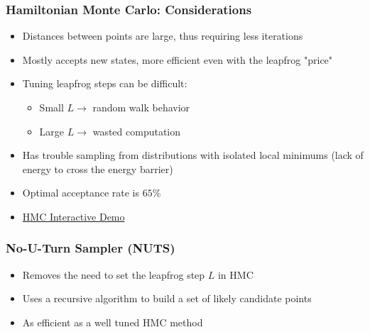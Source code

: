 \documentclass{beamer}
\begin{document}
\begin{frame}
  \frametitle{Hamiltonian Monte Carlo: Considerations}
  \begin{itemize}
    \item Distances between points are large, thus requiring less iterations
    \item Mostly accepts new states, more efficient even with the leapfrog "price"
    \item Tuning leapfrog steps can be difficult:
    \begin{itemize}
      \item Small $L \rightarrow$ random walk behavior
      \item Large $L \rightarrow$ wasted computation
    \end{itemize}
    \item Has trouble sampling from distributions with isolated local minimums (lack of energy to cross the energy barrier)
    \item Optimal acceptance rate is $65\%$
    \item \href{https://chi-feng.github.io/mcmc-demo/app.html}{HMC Interactive Demo}
  \end{itemize}
\end{frame}

\begin{frame}
  \frametitle{No-U-Turn Sampler (NUTS)}
  \begin{itemize}
    \item Removes the need to set the leapfrog step $L$ in HMC
    \item Uses a recursive algorithm to build a set of likely candidate points
    \item As efficient as a well tuned HMC method
  \end{itemize}
\end{frame}


\end{document}
